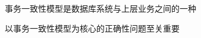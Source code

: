 






\begin{frame}{}
  \begin{center}
    事务一致性模型是数据库系统与上层业务之间的一种

    \vspace{0.30cm}
  \end{center}
\end{frame}

\begin{frame}{}
  \begin{center}
    以事务一致性模型为核心的正确性问题至关重要

    \vspace{0.30cm}
  \end{center}
\end{frame}

\begin{frame}{}
\end{frame}
